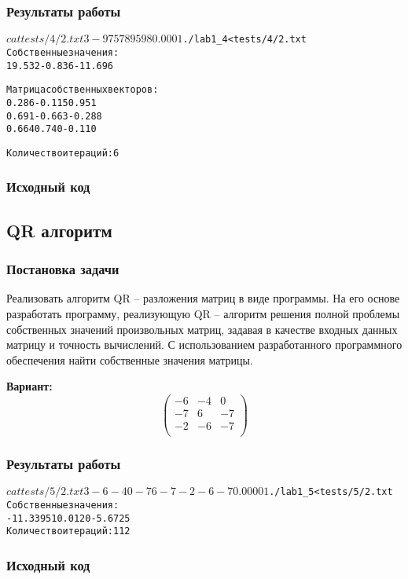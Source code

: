 \subsubsection{Результаты работы}
\begin{alltt}
$ cat tests/4/2.txt
3
-9 7 5
7 8 9
5 9 8
0.0001

$ ./lab1_4 < tests/4/2.txt
Собственные значения:
  19.532   -0.836  -11.696

Матрица собственных векторов:
   0.286   -0.115    0.951
   0.691   -0.663   -0.288
   0.664    0.740   -0.110

Количество итераций: 6
\end{alltt}
\pagebreak

\subsubsection{Исходный код}

\pagebreak

\subsection{QR алгоритм}

\subsubsection{Постановка задачи}
Реализовать алгоритм QR – разложения матриц в виде программы. На его основе разработать программу, реализующую QR – алгоритм решения полной проблемы собственных значений произвольных матриц, задавая в качестве входных данных матрицу и точность вычислений. С использованием разработанного программного обеспечения найти собственные значения матрицы.

{\bfseries Вариант:}
\begin{equation*}
\begin{pmatrix}
-6& -4& 0\\
-7& 6& -7\\
-2& -6& -7\\
\end{pmatrix}
\end{equation*}

\subsubsection{Результаты работы}
\begin{alltt}
$ cat tests/5/2.txt
3
-6 -4 0
-7 6 -7
-2 -6 -7
0.00001

$ ./lab1_5 < tests/5/2.txt
Собственные значения:
-11.3395 10.0120 -5.6725
Количество итераций: 112
\end{alltt}
\pagebreak

\subsubsection{Исходный код}

\pagebreak